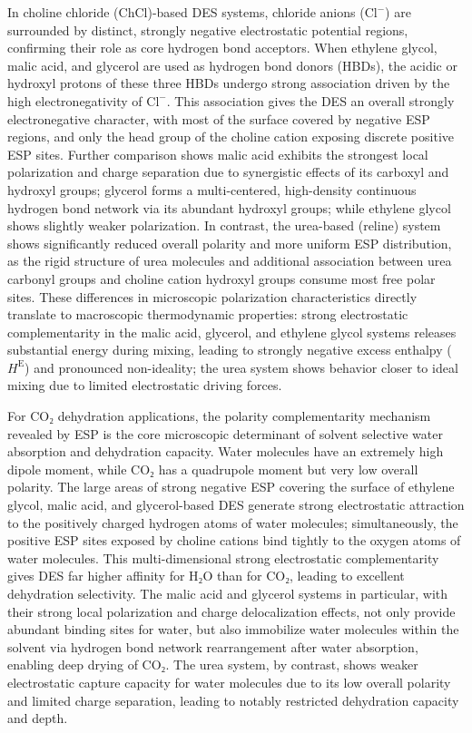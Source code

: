 \documentclass[AMA,LATO2COL]{WileyNJDv5} %
\begin{document}
In choline chloride (ChCl)-based DES systems, chloride anions ($\text{Cl}^-$) are surrounded by distinct, strongly negative electrostatic potential regions, confirming their role as core hydrogen bond acceptors. When ethylene glycol, malic acid, and glycerol are used as hydrogen bond donors (HBDs), the acidic or hydroxyl protons of these three HBDs undergo strong association driven by the high electronegativity of $\text{Cl}^-$. This association gives the DES an overall strongly electronegative character, with most of the surface covered by negative ESP regions, and only the head group of the choline cation exposing discrete positive ESP sites. Further comparison shows malic acid exhibits the strongest local polarization and charge separation due to synergistic effects of its carboxyl and hydroxyl groups; glycerol forms a multi-centered, high-density continuous hydrogen bond network via its abundant hydroxyl groups; while ethylene glycol shows slightly weaker polarization. In contrast, the urea-based (reline) system shows significantly reduced overall polarity and more uniform ESP distribution, as the rigid structure of urea molecules and additional association between urea carbonyl groups and choline cation hydroxyl groups consume most free polar sites. These differences in microscopic polarization characteristics directly translate to macroscopic thermodynamic properties: strong electrostatic complementarity in the malic acid, glycerol, and ethylene glycol systems releases substantial energy during mixing, leading to strongly negative excess enthalpy ($H^\mathrm{E}$) and pronounced non-ideality; the urea system shows behavior closer to ideal mixing due to limited electrostatic driving forces.

For CO₂ dehydration applications, the polarity complementarity mechanism revealed by ESP is the core microscopic determinant of solvent selective water absorption and dehydration capacity. Water molecules have an extremely high dipole moment, while CO₂ has a quadrupole moment but very low overall polarity. The large areas of strong negative ESP covering the surface of ethylene glycol, malic acid, and glycerol-based DES generate strong electrostatic attraction to the positively charged hydrogen atoms of water molecules; simultaneously, the positive ESP sites exposed by choline cations bind tightly to the oxygen atoms of water molecules. This multi-dimensional strong electrostatic complementarity gives DES far higher affinity for H₂O than for CO₂, leading to excellent dehydration selectivity. The malic acid and glycerol systems in particular, with their strong local polarization and charge delocalization effects, not only provide abundant binding sites for water, but also immobilize water molecules within the solvent via hydrogen bond network rearrangement after water absorption, enabling deep drying of CO₂. The urea system, by contrast, shows weaker electrostatic capture capacity for water molecules due to its low overall polarity and limited charge separation, leading to notably restricted dehydration capacity and depth.
\end{document}
